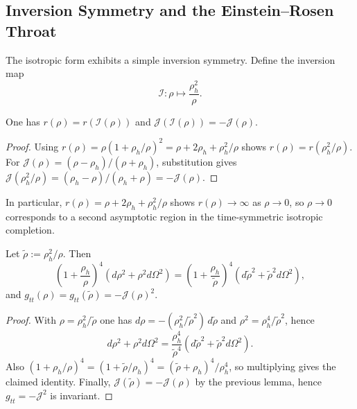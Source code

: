 \subsection{Inversion Symmetry and the Einstein--Rosen Throat}
The isotropic form exhibits a simple inversion symmetry. Define the inversion map
\begin{equation}
  \mathcal{I}: \rho \mapsto \frac{\rho_h^2}{\rho}.
\end{equation}
\begin{lemma}
One has $r(\rho)=r(\mathcal{I}(\rho))$ and $\mathcal{J}(\mathcal{I}(\rho))=-\mathcal{J}(\rho)$.
\end{lemma}
\begin{proof}
Using $r(\rho)=\rho(1+\rho_h/\rho)^2=\rho+2\rho_h+\rho_h^2/\rho$ shows $r(\rho)=r(\rho_h^2/\rho)$. For $\mathcal{J}(\rho)=(\rho-\rho_h)/(\rho+\rho_h)$, substitution gives $\mathcal{J}(\rho_h^2/\rho)=(\rho_h-\rho)/(\rho_h+\rho)=-\mathcal{J}(\rho)$.
\end{proof}

In particular, $r(\rho)=\rho+2\rho_h+\rho_h^2/\rho$ shows $r(\rho)\to\infty$ as $\rho\to 0$, so $\rho\to 0$ corresponds to a second asymptotic region in the time-symmetric isotropic completion.

\begin{lemma}
Let $\tilde{\rho}:=\rho_h^2/\rho$. Then
\begin{equation}
  \left(1+\frac{\rho_h}{\rho}\right)^4\left(d\rho^2+\rho^2 d\Omega^2\right)
  =\left(1+\frac{\rho_h}{\tilde{\rho}}\right)^4\left(d\tilde{\rho}^2+\tilde{\rho}^2 d\Omega^2\right),
\end{equation}
and $g_{tt}(\rho)=g_{tt}(\tilde{\rho})=-\mathcal{J}(\rho)^2$.
\end{lemma}
\begin{proof}
With $\rho=\rho_h^2/\tilde{\rho}$ one has $d\rho = -(\rho_h^2/\tilde{\rho}^2)\,d\tilde{\rho}$ and $\rho^2=\rho_h^4/\tilde{\rho}^2$, hence
\begin{equation}
  d\rho^2+\rho^2 d\Omega^2=\frac{\rho_h^4}{\tilde{\rho}^4}\left(d\tilde{\rho}^2+\tilde{\rho}^2 d\Omega^2\right).
\end{equation}
Also $\left(1+\rho_h/\rho\right)^4=\left(1+\tilde{\rho}/\rho_h\right)^4=(\tilde{\rho}+\rho_h)^4/\rho_h^4$, so multiplying gives the claimed identity. Finally, $\mathcal{J}(\tilde{\rho})=-\mathcal{J}(\rho)$ by the previous lemma, hence $g_{tt}=-\mathcal{J}^2$ is invariant.
\end{proof}

